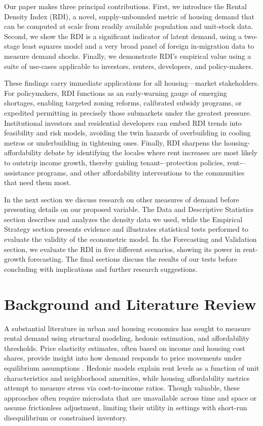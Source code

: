 \documentclass[APA,Times1COL]{WileyNJDv5} %
\begin{document}
Our paper makes three principal contributions. First, we introduce the Rental Density Index (RDI), a novel, supply-unbounded metric of housing demand that can be computed at scale from readily available population and unit‐stock data. Second, we show the RDI is a significant indicator of latent demand, using a two-stage least squares model and a very broad panel of foreign in-migration data to measure demand shocks. Finally, we demonstrate RDI’s empirical value using a suite of use-cases applicable to investors, renters, developers, and policy-makers.

These findings carry immediate applications for all housing---market stakeholders. For policymakers, RDI functions as an early-warning gauge of emerging shortages, enabling targeted zoning reforms, calibrated subsidy programs, or expedited permitting in precisely those submarkets under the greatest pressure. Institutional investors and residential developers can embed RDI trends into feasibility and risk models, avoiding the twin hazards of overbuilding in cooling metros or underbuilding in tightening ones. Finally, RDI sharpens the housing‐affordability debate by identifying the locales where rent increases are most likely to outstrip income growth, thereby guiding tenant‐--protection policies, rent‐--assistance programs, and other affordability interventions to the communities that need them most.

In the next section we discuss research on other measures of demand before presenting details on our proposed variable. The Data and Descriptive Statistics section describes and analyzes the density data we used, while the Empirical Strategy section presents evidence and illustrates statistical tests performed to evaluate the validity of the econometric model. In the Forecasting and Validation section, we evaluate the RDI in five different scenarios, showing its power in rent-growth forecasting. The final sections discuss the results of our tests before concluding with implications and further research suggestions. 

\section{Background and Literature Review}
\label{sec2}

A substantial literature in urban and housing economics has sought to measure rental demand using structural modeling, hedonic estimation, and affordability thresholds. Price elasticity estimates, often based on income and housing cost shares, provide insight into how demand responds to price movements under equilibrium assumptions \cite{green2002measuring, malpezzi1996rent}. Hedonic models explain rent levels as a function of unit characteristics and neighborhood amenities, while housing affordability metrics attempt to measure stress via cost-to-income ratios. Though valuable, these approaches often require microdata that are unavailable across time and space or assume frictionless adjustment, limiting their utility in settings with short-run disequilibrium or constrained inventory.
\end{document}
